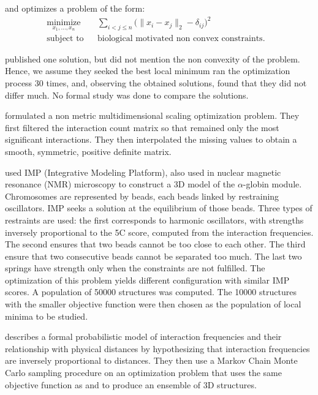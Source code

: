 \citet{tanizawa:mapping} and \citet{duan:three} optimizes a problem of the
form:
\begin{equation*}
\renewcommand{\arraystretch}{2}
\begin{array}{ccll}
\underset{x_1,\ldots, x_n}{\text{minimize}} & & 
\underset{i<j\leq n}{\sum} \big(\|x_i - x_j\|_2 - \delta_{ij}\big)^2 &\\
\text{subject to}
& & \text{biological motivated non convex constraints.}
\end{array}
\end{equation*}

\citet{tanizawa:mapping} published one solution, but did not mention the non
convexity of the problem. Hence, we assume they seeked the best local minimum
\citet{duan:three} ran the optimization process 30 times, and, observing the
obtained solutions, found that they did not differ much. No formal study was
done to compare the solutions.

\citet{ben-elazar:spatial} formulated a non metric multidimensional scaling
optimization problem. They first filtered the interaction count matrix so that
remained only the most significant interactions. They then interpolated the
missing values to obtain a smooth, symmetric, positive definite matrix.

\citet{bau:three-dimensional} used IMP (Integrative Modeling Platform), also
used in nuclear magnetic resonance (NMR) microscopy to construct a 3D model of
the $\alpha$-globin module. Chromosomes are represented by beads, each beads
linked by restraining oscillators. IMP seeks a solution at the equilibrium of
those beads. Three types of restraints are used: the first  corresponds to
harmonic oscillators, with strengths inversely proportional to the 5C
score, computed from the interaction frequencies. The second ensures that two
beads cannot be too close to each other. The third ensure that two consecutive
beads cannot be separated too much. The last two springs have strength only
when the constraints are not fulfilled. The optimization of this problem
yields different configuration with similar IMP scores. A population of 50000
structures was computed. The 10000 structures with the smaller objective
function were then chosen as the population of local minima to be studied.

\citet{rousseau:three} describes a formal probabilistic model of interaction
frequencies and their relationship with physical distances by hypothesizing
that interaction frequencies are inversely proportional to distances. They
then use a Markov Chain Monte Carlo sampling procedure on an optimization
problem that uses the same objective function as \citet{tanizawa:mapping} and
\citet{duan:three} to produce an ensemble of 3D structures.

